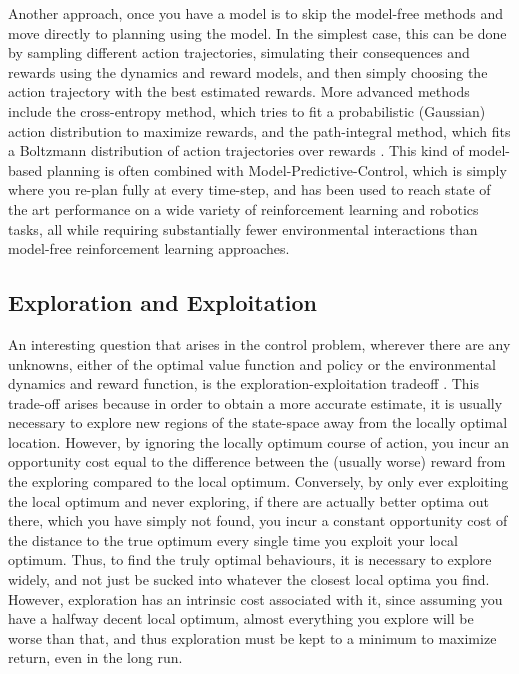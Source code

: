 Another approach, once you have a model is to skip the model-free methods and move directly to planning using the model. In the simplest case, this can be done by sampling different action trajectories, simulating their consequences and rewards using the dynamics and reward models, and then simply choosing the action trajectory with the best estimated rewards. More advanced methods include the cross-entropy method, which tries to fit a probabilistic (Gaussian) action distribution to maximize rewards, and the path-integral method, which fits a Boltzmann distribution of action trajectories over rewards \citep{kappen2012optimal,rawlik2013probabilistic,theodorou2010reinforcement,williams2017model,williams2018predictive}. This kind of model-based planning is often combined with Model-Predictive-Control, which is simply where you re-plan fully at every time-step, and has been used to reach state of the art performance on a wide variety of reinforcement learning \citep{nagabandi2019deep} and robotics tasks\citep{williams2016aggressive,williams2017information}, all while requiring substantially fewer environmental interactions than model-free reinforcement learning approaches.

\subsection{Exploration and Exploitation}

An interesting question that arises in the control problem, wherever there are any unknowns, either of the optimal value function and policy or the environmental dynamics and reward function, is the exploration-exploitation tradeoff \citep{cohen2007should,dayan2008decision,sutton1998introduction,kaelbling1998planning,mobbs2018foraging,berger2014exploration}. This trade-off arises because in order to obtain a more accurate estimate, it is usually necessary to explore new regions of the state-space away from the locally optimal location. However, by ignoring the locally optimum course of action, you incur an opportunity cost equal to the difference between the (usually worse) reward from the exploring compared to the local optimum. Conversely, by only ever exploiting the local optimum and never exploring, if there are actually better optima out there, which you have simply not found, you incur a constant opportunity cost of the distance to the true optimum every single time you exploit your local optimum. Thus, to find the truly optimal behaviours, it is necessary to explore widely, and not just be sucked into whatever the closest local optima you find. However, exploration has an intrinsic cost associated with it, since assuming you have a halfway decent local optimum, almost everything you explore will be worse than that, and thus exploration must be kept to a minimum to maximize return, even in the long run.

